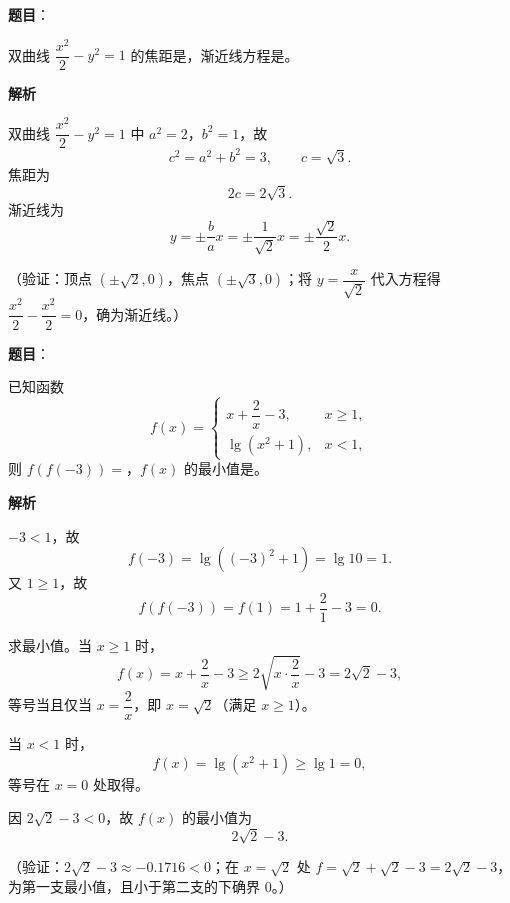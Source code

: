 \begin{answer}

\textbf{题目}：

双曲线 \(\dfrac{x^2}{2}-y^2=1\) 的焦距是\gkblank{}，渐近线方程是\gkblank{}。

\textbf{解析}

双曲线 \(\dfrac{x^2}{2}-y^2=1\) 中 \(a^2=2\)，\(b^2=1\)，故
\nopagebreak[4]
\[
c^2=a^2+b^2=3,\qquad c=\sqrt3.
\]
焦距为
\nopagebreak[4]
\[
2c=2\sqrt3.
\]
渐近线为
\nopagebreak[4]
\[
y=\pm\frac{b}{a}x=\pm\frac{1}{\sqrt2}x=\pm\frac{\sqrt2}{2}x.
\]

（验证：顶点 \((\pm\sqrt2,0)\)，焦点 \((\pm\sqrt3,0)\)；将 \(y=\dfrac{x}{\sqrt2}\) 代入方程得 \(\dfrac{x^2}{2}-\dfrac{x^2}{2}=0\)，确为渐近线。）


\end{answer}
\begin{answer}

\textbf{题目}：

已知函数
\nopagebreak[4]
\[
f(x)=\begin{cases}
x+\dfrac{2}{x}-3, & x\geqslant1,\\
\lg\left(x^2+1\right), & x<1,
\end{cases}
\]
则 \(f(f(-3))=\)\gkblank{}，\(f(x)\) 的最小值是\gkblank{}。

\textbf{解析}

\(-3<1\)，故
\nopagebreak[4]
\[
f(-3)=\lg\left((-3)^2+1\right)=\lg10=1.
\]
又 \(1\geqslant1\)，故
\nopagebreak[4]
\[
f(f(-3))=f(1)=1+\frac21-3=0.
\]

求最小值。当 \(x\geqslant1\) 时，
\nopagebreak[4]
\[
f(x)=x+\frac2x-3\geqslant2\sqrt{x\cdot\frac2x}-3=2\sqrt2-3,
\]
等号当且仅当 \(x=\dfrac2x\)，即 \(x=\sqrt2\)（满足 \(x\geqslant1\)）。

当 \(x<1\) 时，
\nopagebreak[4]
\[
f(x)=\lg\left(x^2+1\right)\geqslant\lg1=0,
\]
等号在 \(x=0\) 处取得。

因 \(2\sqrt2-3<0\)，故 \(f(x)\) 的最小值为
\nopagebreak[4]
\[
2\sqrt2-3.
\]

（验证：\(2\sqrt2-3\approx-0.1716<0\)；在 \(x=\sqrt2\) 处 \(f=\sqrt2+\sqrt2-3=2\sqrt2-3\)，为第一支最小值，且小于第二支的下确界 \(0\)。）


\end{answer}
